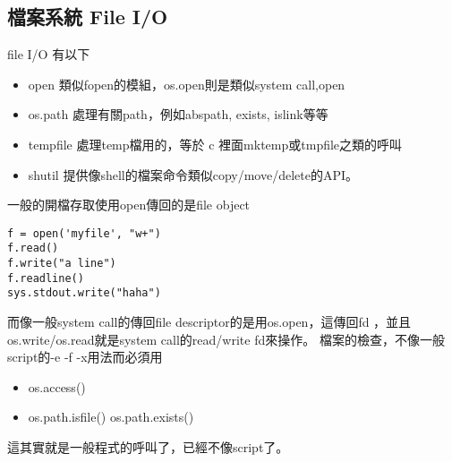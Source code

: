   \subsection{檔案系統 File I/O}
  file I/O 有以下
  \begin{itemize}
    \item open 類似fopen的模組，os.open則是類似system call,open
    \item os.path  處理有關path，例如abspath, exists, islink等等
    \item tempfile 處理temp檔用的，等於 c 裡面mktemp或tmpfile之類的呼叫
    \item shutil 提供像shell的檔案命令類似copy/move/delete的API。
  \end{itemize}

  一般的開檔存取使用open傳回的是file object
\begin{verbatim}
f = open('myfile', "w+")
f.read()
f.write("a line")
f.readline()
sys.stdout.write("haha")
\end{verbatim}
  而像一般system call的傳回file descriptor的是用os.open，這傳回fd
  ，並且os.write/os.read就是system call的read/write fd來操作。
  檔案的檢查，不像一般script的-e -f -x用法而必須用
  \begin{itemize}
    \item os.access()
    \item os.path.isfile() os.path.exists()
  \end{itemize}
  這其實就是一般程式的呼叫了，已經不像script了。

